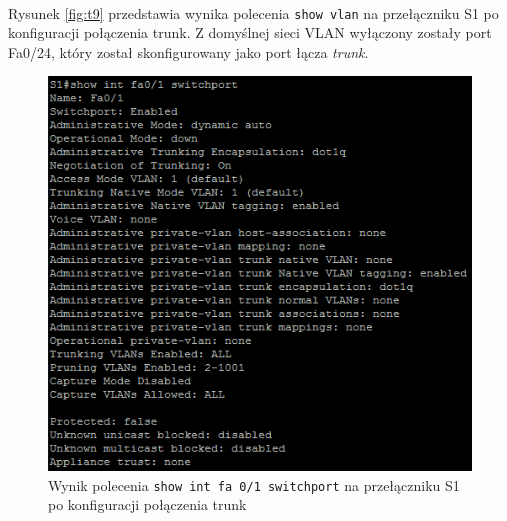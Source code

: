 \documentclass[wide,a4paper,titlepage,12pt] {article}
\begin{document}
  \paragraph{}
  Rysunek \ref{fig:t9} przedstawia wynika polecenia \texttt{show vlan} na przełączniku S1 po konfiguracji połączenia trunk. Z domyślnej sieci VLAN wyłączony zostały port Fa0/24, który został skonfigurowany jako port łącza \emph{trunk}.

  \begin{figure}[H]
    \begin{center}
      \includegraphics[width=\textwidth]{img/t10.PNG}
      \caption{Wynik polecenia \texttt{show int fa 0/1 switchport} na przełączniku S1 po konfiguracji połączenia trunk}
      \label{fig:t10}
    \end{center}
  \end{figure}
\end{document}
